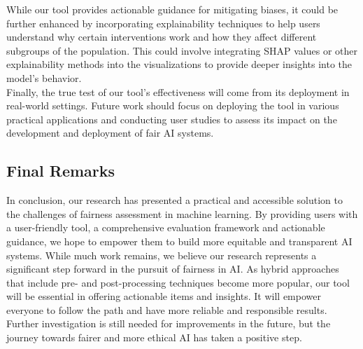 \documentclass[runningheads]{llncs}
\begin{document}
While our tool provides actionable guidance for mitigating biases, it could be further enhanced by incorporating explainability techniques to help users understand why certain interventions work and how they affect different subgroups of the population. This could involve integrating SHAP values or other explainability methods into the visualizations to provide deeper insights into the model's behavior.\\

Finally, the true test of our tool's effectiveness will come from its deployment in real-world settings. Future work should focus on deploying the tool in various practical applications and conducting user studies to assess its impact on the development and deployment of fair AI systems.

\subsection{Final Remarks}
In conclusion, our research has presented a practical and accessible solution to the challenges of fairness assessment in machine learning. By providing users with a user-friendly tool, a comprehensive evaluation framework and actionable guidance, we hope to empower them to build more equitable and transparent AI systems. While much work remains, we believe our research represents a significant step forward in the pursuit of fairness in AI. As hybrid approaches that include pre- and post-processing techniques become more popular, our tool will be essential in offering actionable items and insights. It will empower everyone to follow the path and have more reliable and responsible results. Further investigation is still needed for improvements in the future, but the journey towards fairer and more ethical AI has taken a positive step.
%
%
%
% 
% 
%
\end{document}
